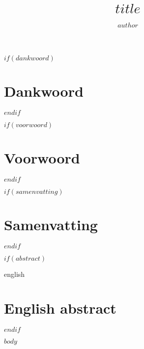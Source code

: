 \documentclass[9pt, twoside]{extreport}
\title{$title$}
\author{$author$}
\begin{document}
\maketitle
{}

$if(dankwoord)$
  \chapter*{Dankwoord}
  
$endif$

$if(voorwoord)$
  \chapter*{Voorwoord}
  
$endif$

$if(samenvatting)$
  \chapter*{Samenvatting}
  
$endif$

$if(abstract)$
  \begin{otherlanguage*}{english}
  \chapter*{English abstract}
  
  \end{otherlanguage*}
$endif$

\tableofcontents
{}

\newpage
{}

$body$
\end{document}
